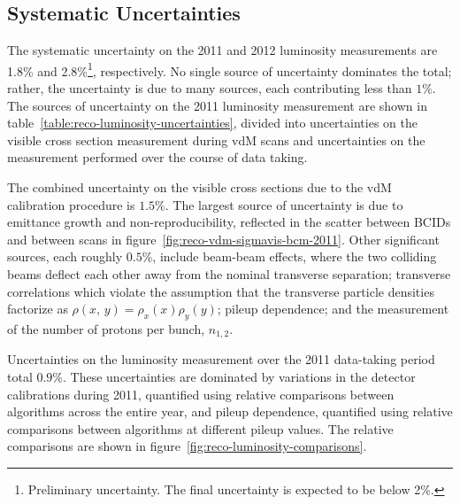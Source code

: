 \subsection{Systematic Uncertainties}\label{sec:reco-luminosity-uncertainties}
The systematic uncertainty on the 2011 and 2012 luminosity measurements are 1.8\% and 2.8\%\footnote{Preliminary uncertainty. The final uncertainty is expected to be below 2\%.}, respectively. No single source of uncertainty dominates the total; rather, the uncertainty is due to many sources, each contributing less than $1\%$. The sources of uncertainty on the 2011 luminosity measurement are shown in table~\ref{table:reco-luminosity-uncertainties}, divided into uncertainties on the visible cross section measurement during vdM scans and uncertainties on the measurement performed over the course of data taking. 

The combined uncertainty on the visible cross sections due to the vdM calibration procedure is $1.5\%$. The largest source of uncertainty is due to emittance growth and non-reproducibility, reflected in the scatter between BCIDs and between scans in figure~\ref{fig:reco-vdm-sigmavis-bcm-2011}. Other significant sources, each roughly $0.5\%$, include beam-beam effects, where the two colliding beams deflect each other away from the nominal transverse separation; transverse correlations which violate the assumption that the transverse particle densities factorize as $\rho(x,\,y)=\rho_x(x)\rho_y(y)$; pileup dependence; and the measurement of the number of protons per bunch, $n_{1,2}$. 

Uncertainties on the luminosity measurement over the 2011 data-taking period total $0.9\%$. These uncertainties are dominated by variations in the detector calibrations during 2011, quantified using relative comparisons between algorithms across the entire year, and pileup dependence, quantified using relative comparisons between algorithms at different pileup values. The relative comparisons are shown in figure~\ref{fig:reco-luminosity-comparisons}.

